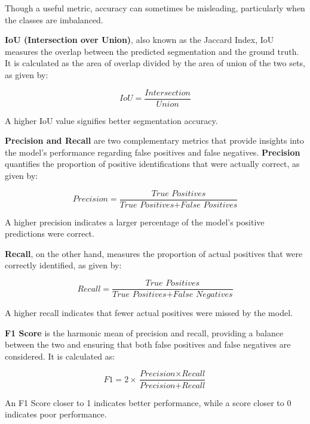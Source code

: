 \documentclass[11pt, a4paper,oneside,chapterprefix=false]{scrbook}
\begin{document}
Though a useful metric, accuracy can sometimes be misleading, particularly when the classes are imbalanced.

\vspace{10pt}

\textbf{IoU (Intersection over Union)}, also known as the Jaccard Index, IoU measures the overlap between the predicted segmentation and the ground truth. It is calculated as the area of overlap divided by the area of union of the two sets, as given by:

\[
	IoU = \frac{\textit{Intersection}}{\textit{Union}}
\]

A higher IoU value signifies better segmentation accuracy.

\vspace{10pt}

\textbf{Precision and Recall} are two complementary metrics that provide insights into the model's performance regarding false positives and false negatives. \textbf{Precision} quantifies the proportion of positive identifications that were actually correct, as given by:

\[
	\textit{Precision} = \frac{\textit{True Positives}}{\textit{True Positives} + \textit{False Positives}}
\]

A higher precision indicates a larger percentage of the model's positive predictions were correct.

\vspace{10pt}

\textbf{Recall}, on the other hand, measures the proportion of actual positives that were correctly identified, as given by:

\[
	\textit{Recall} = \frac{\textit{True Positives}}{\textit{True Positives} + \textit{False Negatives}}
\]

A higher recall indicates that fewer actual positives were missed by the model.

\vspace{10pt}

\textbf{F1 Score} is the harmonic mean of precision and recall, providing a balance between the two and ensuring that both false positives and false negatives are considered. It is calculated as:

\[
	F1 = 2 \times \frac{\textit{Precision} \times \textit{Recall}}{\textit{Precision} + \textit{Recall}}
\]

An F1 Score closer to 1 indicates better performance, while a score closer to 0 indicates poor performance.
\end{document}
